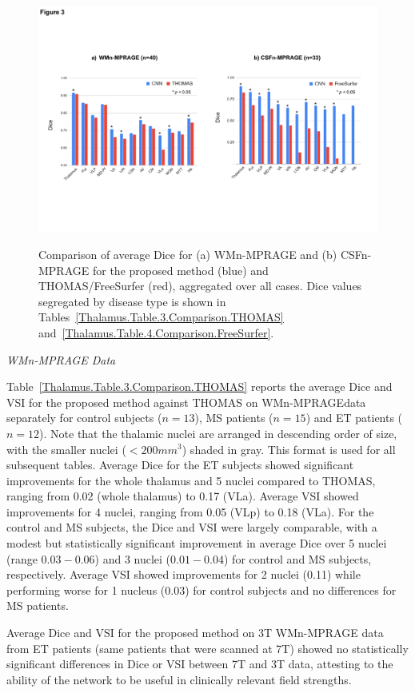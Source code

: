 \begin{figure}[!htbp]
\includegraphics[width=\textwidth]{figures/pdf/slide3.pdf}\label{Thalamus.Fig.1.Dice}
\caption{{Comparison of average Dice for (a) WMn-MPRAGE and (b) CSFn-MPRAGE for the proposed method (blue) and THOMAS/FreeSurfer (red), aggregated over all cases. Dice values segregated by disease type is shown in Tables~\ref{Thalamus.Table.3.Comparison.THOMAS} and~\ref{Thalamus.Table.4.Comparison.FreeSurfer}.}}
\end{figure}


\emph{WMn-MPRAGE Data}

Table~\ref{Thalamus.Table.3.Comparison.THOMAS} reports the average Dice and VSI for the proposed method against THOMAS on WMn-MPRAGEdata separately for control subjects ($n=13$), MS patients ($n=15$) and ET patients ($n=12$). Note that the thalamic nuclei are arranged in descending order of size, with the smaller nuclei ($< 200 mm^3$) shaded in gray. This format is used for all subsequent tables. Average Dice for the ET subjects showed significant improvements for the whole thalamus and 5 nuclei compared to THOMAS, ranging from 0.02 (whole thalamus) to 0.17 (VLa). Average VSI showed improvements for 4 nuclei, ranging from 0.05 (VLp) to 0.18 (VLa). For the control and MS subjects, the Dice and VSI were largely comparable, with a modest but statistically significant improvement in average Dice over 5 nuclei (range $0.03-0.06$) and 3 nuclei ($0.01-0.04$) for control and MS subjects, respectively. Average VSI showed improvements for 2 nuclei (0.11) while performing worse for 1 nucleus (0.03) for control subjects and no differences for MS patients.

Average Dice and VSI for the proposed method on 3T WMn-MPRAGE data from ET patients (same patients that were scanned at 7T) showed no statistically significant differences in Dice or VSI between 7T and 3T data, attesting to the ability of the network to be useful in clinically relevant field strengths.

